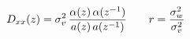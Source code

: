 \documentclass[preview]{standalone}
\begin{document}
\begin{align*}
\special{dvisvgm:raw <g id='unique000'>}D_{xx}(z)=\sigma_v^2\,\frac{\alpha(z)\,\alpha(z^{-1})}{a(z)\,a(z^{-1})}\qquad r=\frac{\sigma_w^2}{\sigma_v^2}\special{dvisvgm:raw </g>}
\end{align*}
\end{document}
